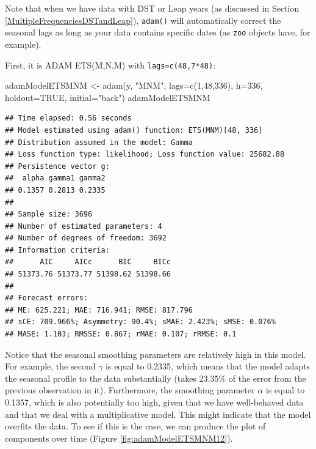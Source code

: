\documentclass[
]{book}
\newenvironment{Shaded}{\begin{snugshade}}{\end{snugshade}}
\newcommand{\AttributeTok}[1]{\textcolor[rgb]{0.77,0.63,0.00}{#1}}
\newcommand{\ConstantTok}[1]{\textcolor[rgb]{0.00,0.00,0.00}{#1}}
\newcommand{\DecValTok}[1]{\textcolor[rgb]{0.00,0.00,0.81}{#1}}
\newcommand{\FunctionTok}[1]{\textcolor[rgb]{0.00,0.00,0.00}{#1}}
\newcommand{\NormalTok}[1]{#1}
\newcommand{\OtherTok}[1]{\textcolor[rgb]{0.56,0.35,0.01}{#1}}
\newcommand{\StringTok}[1]{\textcolor[rgb]{0.31,0.60,0.02}{#1}}
\theoremstyle{definition}
\theoremstyle{definition}
\theoremstyle{definition}
\theoremstyle{definition}
\theoremstyle{remark}
\begin{document}
Note that when we have data with DST or Leap years (as discussed in Section \ref{MultipleFrequenciesDSTandLeap}), \texttt{adam()} will automatically correct the seasonal lags as long as your data contains specific dates (as \texttt{zoo} objects have, for example).

First, it is ADAM ETS(M,N,M) with \texttt{lags=c(48,7*48)}:

\begin{Shaded}
\begin{Highlighting}[]
\NormalTok{adamModelETSMNM }\OtherTok{\textless{}{-}} \FunctionTok{adam}\NormalTok{(y, }\StringTok{"MNM"}\NormalTok{, }\AttributeTok{lags=}\FunctionTok{c}\NormalTok{(}\DecValTok{1}\NormalTok{,}\DecValTok{48}\NormalTok{,}\DecValTok{336}\NormalTok{),}
                        \AttributeTok{h=}\DecValTok{336}\NormalTok{, }\AttributeTok{holdout=}\ConstantTok{TRUE}\NormalTok{,}
                        \AttributeTok{initial=}\StringTok{"back"}\NormalTok{)}
\NormalTok{adamModelETSMNM}
\end{Highlighting}
\end{Shaded}

\begin{verbatim}
## Time elapsed: 0.56 seconds
## Model estimated using adam() function: ETS(MNM)[48, 336]
## Distribution assumed in the model: Gamma
## Loss function type: likelihood; Loss function value: 25682.88
## Persistence vector g:
##  alpha gamma1 gamma2 
## 0.1357 0.2813 0.2335 
## 
## Sample size: 3696
## Number of estimated parameters: 4
## Number of degrees of freedom: 3692
## Information criteria:
##      AIC     AICc      BIC     BICc 
## 51373.76 51373.77 51398.62 51398.66 
## 
## Forecast errors:
## ME: 625.221; MAE: 716.941; RMSE: 817.796
## sCE: 709.966%; Asymmetry: 90.4%; sMAE: 2.423%; sMSE: 0.076%
## MASE: 1.103; RMSSE: 0.867; rMAE: 0.107; rRMSE: 0.1
\end{verbatim}

Notice that the seasonal smoothing parameters are relatively high in this model. For example, the second \(\gamma\) is equal to 0.2335, which means that the model adapts the seasonal profile to the data substantially (takes 23.35\% of the error from the previous observation in it). Furthermore, the smoothing parameter \(\alpha\) is equal to 0.1357, which is also potentially too high, given that we have well-behaved data and that we deal with a multiplicative model. This might indicate that the model overfits the data. To see if this is the case, we can produce the plot of components over time (Figure \ref{fig:adamModelETSMNM12}).
\end{document}
